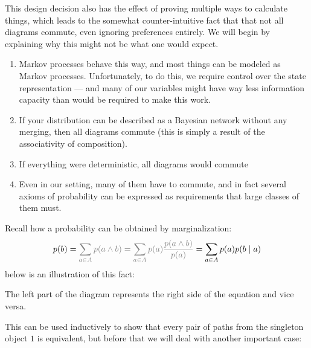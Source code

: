 \documentclass{article}
\begin{document}
	This design decision also has the effect of proving multiple ways to calculate things, which leads to the somewhat counter-intuitive fact that that not all diagrams commute, even ignoring preferences entirely. We will begin by explaining why this might not be what one would expect. 
	\begin{enumerate}
		\item Markov processes behave this way, and most things can be modeled as Markov processes. Unfortunately, to do this, we require control over the state representation --- and many of our variables might have way less information capacity than would be required to make this work.
		\item If your distribution can be described as a Bayesian network without any merging, then all diagrams commute (this is simply a result of the associativity of composition).
		\item If everything were deterministic, all diagrams would commute
		\item Even in our setting, many of them have to commute, and in fact several axioms of probability can be expressed as requirements that large classes of them must.
	\end{enumerate}

	
	\begin{example}[Marginalization] \label{ex:margin}
		Recall how a probability can be obtained by marginalization:
		\[ p(b) = {\color{gray}\sum_{a \in A} p(a \land b) = \sum_{a \in A} p(a) \frac{p(a\land b)}{p(a)} }= \sum_{a \in A} p(a) p(b\mid a) \]
		below is an illustration of this fact:
		\begin{center}
		\end{center}
		The left part of the diagram represents the right side of the equation and vice versa. 
	\end{example} 

	This can be used inductively to show that every pair of paths from the singleton object $1$ is equivalent, but before that we will deal with another important case:
	
\end{document}
